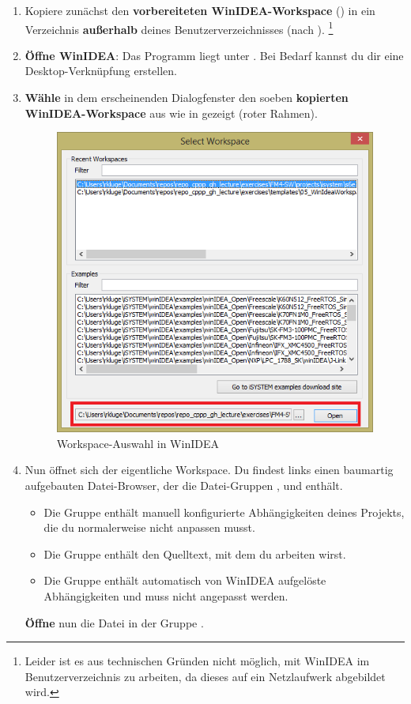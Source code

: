 \begin{enumerate}
\item 
Kopiere zunächst den \textbf{vorbereiteten WinIDEA-Workspace} () in ein Verzeichnis \textbf{außerhalb} deines Benutzerverzeichnisses (\bspw nach ).
\footnote{Leider ist es aus technischen Gründen nicht möglich, mit WinIDEA im Benutzerverzeichnis zu arbeiten, da dieses auf ein Netzlaufwerk abgebildet wird.}

\item 
\textbf{Öffne WinIDEA}:
Das Programm liegt unter .
Bei Bedarf kannst du dir eine Desktop-Verknüpfung erstellen.

\item 
\textbf{Wähle} in dem erscheinenden Dialogfenster den soeben \textbf{kopierten WinIDEA-Workspace} aus wie in  gezeigt (roter Rahmen).
\begin{figure}
\begin{centering}
\includegraphics[width=.5\textwidth]{./05_c/figures/WinIDEASelectWorkspace.png}
\caption{Workspace-Auswahl in WinIDEA}
\label{fig:WinIdeaSelectWorkspace}
\end{centering}
\end{figure}

\item 
Nun öffnet sich der eigentliche Workspace.
Du findest links einen baumartig aufgebauten Datei-Browser, der die Datei-Gruppen ,  und  enthält.
\begin{itemize}
\item
Die Gruppe  enthält manuell konfigurierte Abhängigkeiten deines Projekts, die du normalerweise nicht anpassen musst.
\item 
Die Gruppe  enthält den Quelltext, mit dem du arbeiten wirst.
\item 
Die Gruppe  enthält automatisch von WinIDEA aufgelöste Abhängigkeiten und muss nicht angepasst werden.
\end{itemize}
\textbf{Öffne} nun die Datei \textbf{} in der Gruppe .


\end{enumerate}
